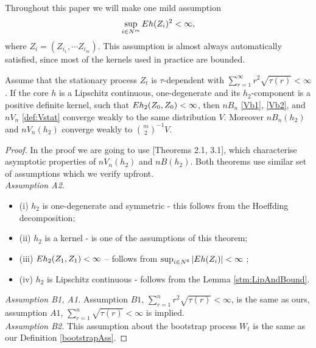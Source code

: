 Throughout this paper we will make one mild assumption
\[
  \sup_{i \in N^m}E h(Z_i)^2 < \infty,
 \]
 where $Z_i = (Z_{i_1},\cdots Z_{i_m})$. This assumption is almost always automatically satisfied, since most of the kernels used in practice are bounded.
\begin{Theorem}
\label{th:mainOne}
Assume that the stationary process $Z_t$ is $\tau$-dependent with $\sum_{r=1}^\infty r^2 \sqrt{\tau(r)} < \infty$. If the core $h$ is a Lipschitz continuous, one-degenerate and its $h_2$-component is a positive definite kernel, such that $E h_2(Z_0,Z_0) < \infty$, then $nB_n$ \eqref{Vb1}, \eqref{Vb2},  and $n V_n$  \eqref{def:Vstat} converge weakly to the same distribution $V$.  Moreover $nB_n(h_2)$ and $nV_n(h_2)$ converge weakly to $\binom {m} {2} ^{-1} V$.
\end{Theorem}
\begin{proof}
In the proof we are going to use \cite{leucht_dependent_2013}[Theorems 2.1, 3.1], which characterise asymptotic properties of $nV_n(h_2)$ and $n B(h_2)$. Both  theorems use similar set of assumptions which we verify upfront.  \\
\textit{Assumption A2.}\begin{itemize}
 \item (i)  $h_2$ is one-degenerate and symmetric - this follows from the Hoeffding decomposition;
 \item (ii) $h_2$ is a kernel - is one of the assumptions of this theorem;
 \item (iii) $E h_2(Z_1,Z_1) < \infty$ -- follows from $\sup_{i \in N^6}|E h(Z_i) |<\infty$ ;
 \item  (iv) $h_2$ is Lipschitz continuous - follows from the Lemma \ref{stm:LipAndBound}.
\end{itemize}
\textit{Assumption B1, A1.} Assumption $B1$, $\sum_{r=1}^n r^2 \sqrt{\tau(r)} < \infty$, is the same as ours, assumption $A1$, $\sum_{r=1}^n  \sqrt{\tau(r)} < \infty$ is implied.\\
\textit{Assumption B2.} This assumption about the bootstrap process $W_t$ is the same as our Definition \ref{bootstrapAss}. 



\end{proof}
